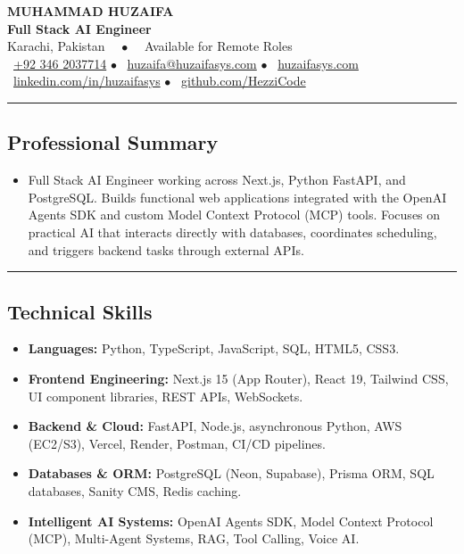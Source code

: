 \documentclass[11pt,letterpaper]{article}
\begin{document}
\begin{center}
	{\LARGE \textbf{MUHAMMAD HUZAIFA}}\\
	\vspace{0.08cm}
	{\large \textbf{Full Stack AI Engineer}}\\
	\vspace{0.08cm}
	Karachi, Pakistan \ \ $\bullet$ \ \ Available for Remote Roles
	\vspace{0.12cm}
	\\
	\faPhone \ \href{tel:+923462037714}{+92 346 2037714} \quad $\bullet$ \quad
	\faEnvelope \ \href{mailto:huzaifa@huzaifasys.com}{huzaifa@huzaifasys.com} \quad $\bullet$ \quad 
	\faGlobe \ \href{https://huzaifasys.com}{huzaifasys.com}
	\\
	\vspace{0.08cm}
	\faLinkedin \ \href{https://linkedin.com/in/huzaifasys}{linkedin.com/in/huzaifasys} \quad $\bullet$ \quad
	\faGithub \ \href{https://github.com/HezziCode}{github.com/HezziCode}
\end{center}

\hrule
\vspace{-0.8em}
\subsection*{\Large Professional Summary}

\begin{itemize}[leftmargin=1em,noitemsep]
	\item Full Stack AI Engineer working across Next.js, Python FastAPI, and PostgreSQL. Builds functional web applications integrated with the OpenAI Agents SDK and custom Model Context Protocol (MCP) tools. Focuses on practical AI that interacts directly with databases, coordinates scheduling, and triggers backend tasks through external APIs.
\end{itemize}

\vspace{0.2em}
\hrule
\vspace{-0.8em}
\subsection*{\Large Technical Skills}

\begin{itemize}[leftmargin=1em,noitemsep]
	\item \textbf{Languages:} Python, TypeScript, JavaScript, SQL, HTML5, CSS3.
	\item \textbf{Frontend Engineering:} Next.js 15 (App Router), React 19, Tailwind CSS, UI component libraries, REST APIs, WebSockets.
	\item \textbf{Backend \& Cloud:} FastAPI, Node.js, asynchronous Python, AWS (EC2/S3), Vercel, Render, Postman, CI/CD pipelines.
	\item \textbf{Databases \& ORM:} PostgreSQL (Neon, Supabase), Prisma ORM, SQL databases, Sanity CMS, Redis caching.
	\item \textbf{Intelligent AI Systems:} OpenAI Agents SDK, Model Context Protocol (MCP), Multi-Agent Systems, RAG, Tool Calling, Voice AI.
\end{itemize}
\end{document}
